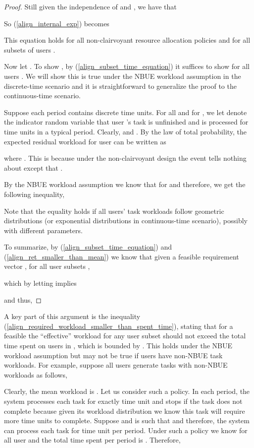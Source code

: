 \documentclass[prodmode,acmtompecs]{acmsmall}
\begin{document}
\begin{proof}
Still given the independence of  and , we have that


So (\ref{align_internal_exp}) becomes

This equation holds for all non-clairvoyant resource allocation policies and for all subsets of users . 


Now let . To show , by (\ref{align_subset_time_equation}) it suffices to show  for all users . We will show this is true under the NBUE workload assumption in the discrete-time scenario and it is straightforward to generalize the proof to the continuous-time scenario. 

Suppose each period contains  discrete time units. 
For all  and for , we let  denote the indicator random variable that user 's task is unfinished and is processed for  time units in a typical period. Clearly,  and . By the law of total probability, the expected residual workload  for user  can be written as

where . 
This is because under the non-clairvoyant design the event  tells nothing about  except that . 

By the NBUE workload assumption we know that  for  and therefore, we get the following inequality,

Note that the equality holds if all users' task workloads follow geometric distributions (or exponential distributions in continuous-time scenario), possibly with different parameters. 

To summarize, by (\ref{align_subset_time_equation}) and (\ref{align_ret_smaller_than_mean}) we know that given a feasible requirement vector , for all user subsets ,

which by letting  implies

and thus, 

\end{proof}

A key part of this argument is the inequality (\ref{align_required_workload_smaller_than_spent_time}), stating that for a feasible  the ``effective'' workload  for any user subset  should not exceed the total time spent on users in , which is bounded by . 
This holds under the NBUE workload assumption but may not be true if users have non-NBUE task workloads. For example, suppose all users generate tasks with non-NBUE workloads as follows, 

Clearly, the mean workload is . 
Let us consider such a policy. In each period, the system processes each task for exactly  time unit and stops if the task does not complete because given its workload distribution we know this task will require  more time units to complete. Suppose  and  is such that  and therefore, the system can process each task for  time unit per period. Under such a policy we know  for all user  and the total time spent per period is . Therefore, 
\end{document}
